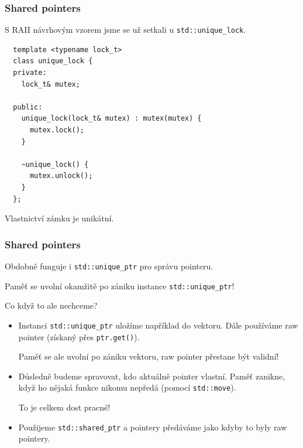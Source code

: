 \documentclass[usenames,dvipsnames,9pt]{beamer}
\begin{document}
\begin{frame}[fragile]
  \frametitle{Shared pointers}

  S RAII návrhovým vzorem jsme se už setkali u \texttt{std::unique_lock}.

  \begin{verbatim}
  template <typename lock_t>
  class unique_lock {
  private:
    lock_t& mutex;

  public:
    unique_lock(lock_t& mutex) : mutex(mutex) {
      mutex.lock();
    }

    ~unique_lock() {
      mutex.unlock();
    }
  };
  \end{verbatim}

  \pause
  \begin{center}
  	\Large Vlastnictví zámku je unikátní.
  \end{center}
\end{frame}

\begin{frame}[fragile]
  \frametitle{Shared pointers}

  Obdobně funguje i \texttt{std::unique\_ptr} pro správu pointeru.

  \hfill Paměť se uvolní okamžitě po zániku instance \texttt{std::unique\_ptr}!

  \vspace{0.5em}
  \begin{center}
  	\Large Co když to ale nechceme?
  \end{center}

  \vspace{2em}
  \begin{itemize}
  	\pause\item Instanci \texttt{std::unique\_ptr} uložíme například do vektoru.
  				Dále používáme raw pointer (získaný přes \texttt{ptr.get()}).

  				\hfill Paměť se ale uvolní po zániku vektoru, raw pointer přestane být validní! \\[0.3em]

  	\pause\item Důsledně budeme spravovat, kdo aktuálně pointer vlastní.
  				Paměť zanikne, když ho nějaká funkce nikomu nepředá (pomocí \texttt{std::move}).

  				\hfill To je celkem dost pracné! \\[0.3em]

  	\pause\item Použijeme \texttt{std::shared\_ptr} a pointery předáváme jako kdyby to byly raw pointery.
  \end{itemize}
\end{frame}
\end{document}
